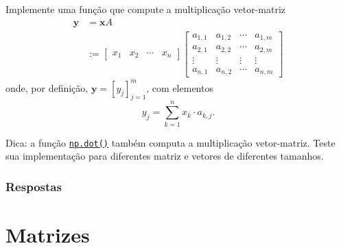 \begin{exer}
  Implemente uma função que compute a multiplicação vetor-matriz
  \begin{subequations}
    \begin{align}
      \pmb{y} &= \pmb{x}A \\
              &:= \begin{bmatrix}
                x_1 & x_2 & \cdots & x_n
              \end{bmatrix}
                                     \begin{bmatrix}
                                       a_{1,1} & a_{1,2} & \cdots & a_{1,m}\\
                                       a_{2,1} & a_{2,2} & \cdots & a_{2,m}\\
                                       \vdots & \vdots & \vdots & \vdots\\
                                       a_{n,1} & a_{n,2} & \cdots & a_{n,m}
                                     \end{bmatrix}
    \end{align}
  \end{subequations}
  onde, por definição, $\pmb{y} = [y_j]_{j=1}^m$, com elementos
  \begin{equation}
    y_j = \sum_{k=1}^n x_k\cdot a_{k,j}.
  \end{equation}
\end{exer}
\begin{resp}
  Dica: a função \href{https://numpy.org/devdocs/reference/generated/numpy.dot.html}{\lstinline+np.dot()+} também computa a multiplicação vetor-matriz. Teste sua implementação para diferentes matriz e vetores de diferentes tamanhos.
\end{resp}

\ifisbook
\subsubsection{Respostas}
\shipoutAnswer
\fi


\section{Matrizes}\label{cap_arr_sec_mat}

